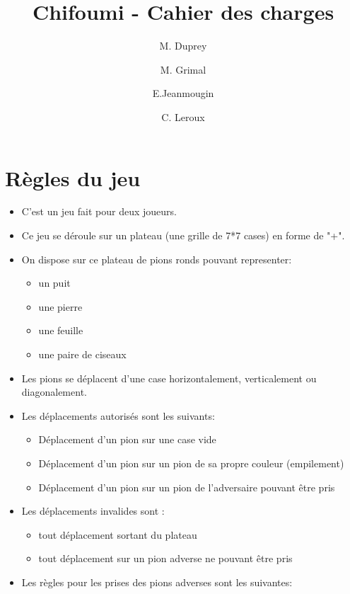 \documentclass[12pt]{article}
\begin{document}
 
\title{Chifoumi - Cahier des charges}
\author{M. Duprey \and M. Grimal \and E.Jeanmougin \and C. Leroux}
 
 
 \maketitle
 
 \newpage
 \tableofcontents
\newpage

\section{Règles du jeu}

\begin{itemize}

 \item C'est un jeu fait pour deux joueurs.
 \item Ce jeu se déroule sur un plateau (une grille de 7*7 cases) en forme de "+".
 \item On dispose sur ce plateau de pions ronds pouvant representer:
 \begin{itemize}
    \item[\textbullet] un puit
    \item[\textbullet] une pierre
    \item[\textbullet] une feuille
    \item[\textbullet] une paire de ciseaux
 \end{itemize}
\item Les pions se déplacent d'une case horizontalement, verticalement ou diagonalement.
\item Les déplacements autorisés sont les suivants:
\begin{itemize}
  \item[\textbullet]Déplacement d'un pion sur une case vide
  \item[\textbullet]Déplacement d'un pion sur un pion de sa propre couleur (empilement)
  \item[\textbullet]Déplacement d'un pion sur un pion de l'adversaire pouvant être pris
\end{itemize}
\item Les déplacements invalides sont :
\begin{itemize}
 \item[\textbullet] tout déplacement sortant du plateau 
 \item[\textbullet] tout déplacement sur un pion adverse ne pouvant être pris
\end{itemize}
  \item Les règles pour les prises des pions adverses sont les suivantes:

\end{itemize}
\end{document}
